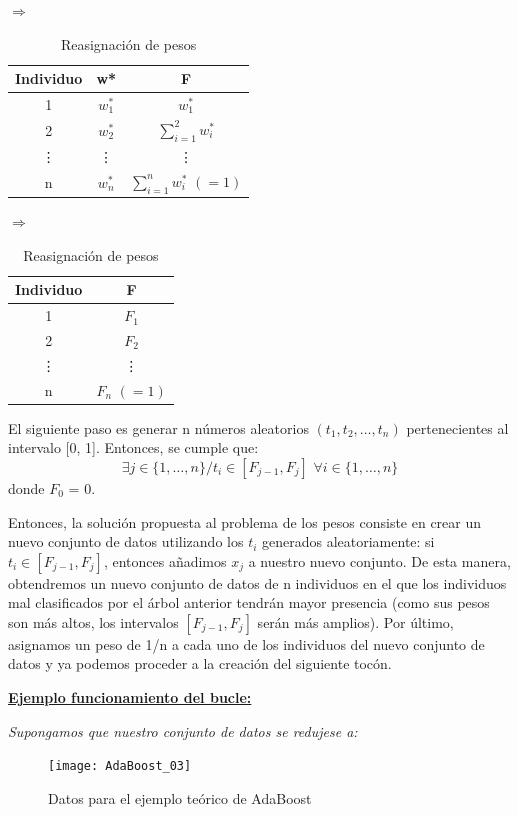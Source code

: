 \documentclass[12pt,twoside]{article}
\begin{document}
\begin{table}[h]
\centering
$\Rightarrow$
\begin{tabular}{|c|c|c|}
\hline
Individuo & w* & F\\ \hline
1 & $w_1^*$ & $w_1^*$ \\ \hline
2 & $w_2^*$ & $\displaystyle \sum_{i=1}^2 w_i^*$ \\ \hline
\vdots & \vdots & \vdots \\ \hline
n & $w_n^*$ & $\displaystyle \sum_{i=1}^n w_i^* \, \, (= 1)$ \\ \hline
\end{tabular}
$\Rightarrow$
\begin{tabular}{|c|c|}
\hline
Individuo & F \\ \hline
1 & $F_1$ \\ \hline
2 & $F_2$ \\ \hline
\vdots & \vdots \\ \hline
n & $F_n \, \, (=1)$ \\ \hline
\end{tabular}
\caption{Reasignación de pesos}
\label{tab:AdaB_pesos}
\end{table}

El siguiente paso es generar n números aleatorios $(t_1, t_2, \dots, t_n)$ pertenecientes al intervalo [0, 1]. Entonces, se cumple que:
\begin{equation*}
\exists j \in \{1, \dots, n \} /t_i \in [F_{j-1}, F_{j}] \, \, \forall i \in \{1, \dots, n \}
\end{equation*}
donde $F_0$ = 0.

Entonces, la solución propuesta al problema de los pesos consiste en crear un nuevo conjunto de datos utilizando los $t_i$ generados aleatoriamente: si $t_i \in [F_{j-1}, F_{j}]$, entonces añadimos $x_j$ a nuestro nuevo conjunto. De esta manera, obtendremos un nuevo conjunto de datos de n individuos en el que los individuos mal clasificados por el árbol anterior tendrán mayor presencia (como sus pesos son más altos, los intervalos $[F_{j-1}, F_{j}]$ serán más amplios). Por último, asignamos un peso de 1/n a cada uno de los individuos del nuevo conjunto de datos y ya podemos proceder a la creación del siguiente tocón.

\bigskip \bigskip

\textbf{\underline{Ejemplo funcionamiento del bucle:}}

\textit{Supongamos que nuestro conjunto de datos se redujese a:}
\begin{figure}[H]
\centering
\texttt{[image: AdaBoost\_03]}
\caption{Datos para el ejemplo teórico de AdaBoost}
\end{figure}
\end{document}

